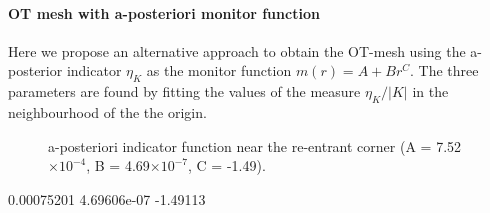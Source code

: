 \documentclass[a4paper,11pt]{article}
\begin{document}

\clearpage
\newpage


\paragraph{OT mesh with a-posteriori monitor function}

Here we propose an alternative approach to obtain the OT-mesh using the a-posterior indicator $\eta_{K}$ as the monitor function $m(r) = A + Br^{C}$. The three parameters are found by fitting the values of the measure $\eta_{K}/|K|$ in the neighbourhood of the the origin.


\begin{figure}[h!]\label{tikz:monitor_posteriori}
\centering
{}
\caption{a-posteriori indicator function near the re-entrant corner  (A = 7.52 $\times 10^{-4}$, B = 4.69$\times 10^{-7}$, C = -1.49).}
\end{figure}

0.00075201
4.69606e-07
-1.49113
\end{document}
